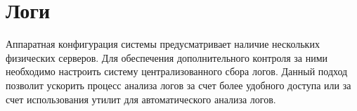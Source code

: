\section{Логи}
Аппаратная конфигурация системы предусматривает наличие нескольких физических
серверов. Для обеспечения дополнительного контроля за ними необходимо настроить
систему централизованного сбора логов. Данный подход позволит ускорить процесс
анализа логов за счет более удобного доступа или за счет использования утилит
для автоматического анализа логов.
